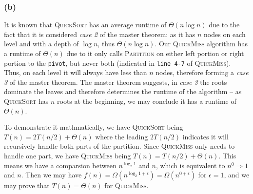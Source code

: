 \documentclass[11pt]{article}
\newcommand{\ilc}{\texttt}
\begin{document}
\subsubsection{(b)}

It is known that \textsc{QuickSort} has an average runtime of $\Theta(n\log n)$ due to the fact that it is considered \textit{case 2} of the master theorem: as it has $n$ nodes on each level and with a depth of $\log n$, thus $\Theta(n\log n)$. Our \textsc{QuickMiss} algorithm has a runtime of $\Theta(n)$ due to it only calls \textsc{Partition} on either left portion or right portion to the \ilc{pivot}, but never both (indicated in \ilc{line 4-7} of \textsc{QuickMiss}). Thus, on each level it will always have less than $n$ nodes, therefore forming a \textit{case 3} of the master theorem. The master theorem suggests, in \textit{case 3} the roots dominate the leaves and therefore determines the runtime of the algorithm -- as \textsc{QuickSort} has $n$ roots at the beginning, we may conclude it has a runtime of $\Theta(n)$.\newline

To demonstrate it mathmatically, we have \textsc{QuickSort} being $T(n) = 2T(n/2) + \Theta(n)$ where  the leading $2T(n/2)$ indicates it will recursively handle both parts of the partition. Since \textsc{QuickMiss} only needs to handle one part, we have \textsc{QuickMiss} being $T(n) = T(n/2) + \Theta(n)$. This means we have a comparsion between $n^{\log_2 1}$ and $n$, which is equivalent to $n^0 \Rightarrow 1$ and $n$. Then we may have $f(n) = \Omega(n^{\log_2 1 + \epsilon}) = \Omega(n^{0 + \epsilon})$ for $\epsilon = 1$, and we may prove that $T(n) = \Theta(n)$ for \textsc{QuickMiss}.


%
% 
% 
\end{document}
